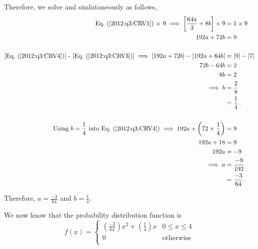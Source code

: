 \begin{subquestions}
\begin{subsubquestions}
Therefore, we solve  and  simlutaneously as follows,
\begin{align}
	\text{\req{2012:q3:CRV1} $\times$ 9} \implies \left[ \frac{64a}{3} + 8b \right] \times 9 & = 1 \times 9 \nn \\
	                                                   192a + 72b & = 9 \label{2012:q3:CRV4} \\ 
	                                                   \nn \\
	\text{[\req{2012:q3:CRV4}] - [\req{2012:q3:CRV3}]} \implies \left[ 192a + 72b \right] - \left[192a + 64b \right]  & = [9]-[7] \nn \\
		                                                               72b-64b & = 2 \nn \\
		                                                               8b & = 2 \nn \\
		                                                               \implies b & = \frac{2}{8} \nn \\
		                                                                          & = \frac{1}{4} \,. \\ \nn \\
\text{Using $b=\frac{1}{4}$ into \req{2012:q3:CRV4}} \implies 192a + \left (72 \times \frac{1}{4} \right) & = 9 \nn \\
                                                                    192a + 18 & = 9 \nn \\
                                                                    192a & = -9 \nn \\ 
                                                                   \implies a & = \frac{-9}{192} \nn \\
                                                                   & = \frac{-3}{64} \,.
\end{align}

Therefore, $a= \frac{-3}{64}$ and $b=\frac{1}{4}$.


\subsubquestion 

We now know that the probability distribution function is 
\[
f(x) =
\begin{cases}
	\left(\frac{-3}{64}\right)x^2+\left(\frac{1}{4}\right)x & \text{$0 \leq x \leq 4$} \\
	0       & \text{otherwise} \\
\end{cases}
\]


\end{subsubquestions}
\end{subquestions}
